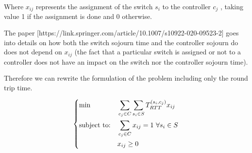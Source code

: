 \documentclass{article}
\begin{document}
Where $x_{ij}$ represents the assignment of the switch $s_{i}$ to the controller $c_j$  , taking value
1 if the assignment is done and 0 otherwise.

The paper [https://link.springer.com/article/10.1007/s10922-020-09523-2] goes into details on how both the switch sojourn time and the controller sojourn do does not depend on $x_{ij}$ (the fact that a particular switch is assigned or not to a controller does not have an impact on the switch nor the controller sojourn time).

Therefore we can rewrite the formulation of the problem including only the round trip time.

\begin{equation}\label{eq:bipartite_formulation_final}
	\begin{dcases}
		\begin{aligned}
			& {\text{min}}
			& & \sum_{c_j \in C} \sum_{s_i \in S} T^{(s_i,c_j)}_{RTT} x_{ij} \\
			& \text{subject to:}
			& & \sum_{c_j \in C} x_{ij} = 1 \ \forall s_i \in S \\
			& & & x_{ij} \ge 0
		\end{aligned}
	\end{dcases}
\end{equation}
\end{document}
